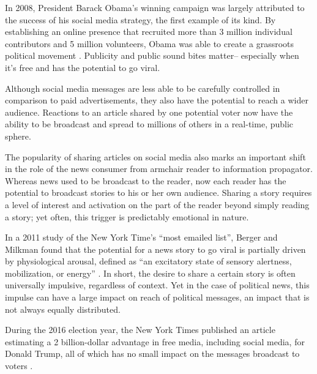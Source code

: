\documentclass[letterpaper]{article}
\begin{document}
In 2008, President Barack Obama's winning campaign was largely attributed to the success of his social media strategy, the first example of its kind. By establishing an online presence that recruited more than 3 million individual contributors and 5 million volunteers, Obama was able to create a grassroots political movement \cite{cogburn2011networked}. Publicity and public sound bites matter-- especially when it’s free and has the potential to go viral.

Although social media messages are less able to be carefully controlled in comparison to paid advertisements, they also have the potential to reach a wider audience. Reactions to an article shared by one potential voter now have the ability to be broadcast and spread to millions of others in a real-time, public sphere. 


The popularity of sharing articles on social media also marks an important shift in the role of the news consumer from armchair reader to information propagator. Whereas news used to be broadcast to the reader, now each reader has the potential to broadcast stories to his or her own audience. Sharing a story requires a level of interest and activation on the part of the reader beyond simply reading a story; yet often, this trigger is predictably emotional in nature. 

In a 2011 study of the New York Time’s ``most emailed list'', Berger and Milkman found that the potential for a news story to go viral is partially driven by physiological arousal, defined as ``an excitatory state of sensory alertness, mobilization, or energy'' \cite{berger2012makes}. In short, the desire to share a certain story is often universally impulsive, regardless of context. Yet in the case of political news, this impulse can have a large impact on reach of political messages, an impact that is not always equally distributed. 

During the 2016 election year, the New York Times published an article estimating a 2 billion-dollar advantage in free media, including social media, for Donald Trump, all of which has no small impact on the messages broadcast to voters \cite{nyt-trump-free-media}.
\end{document}
